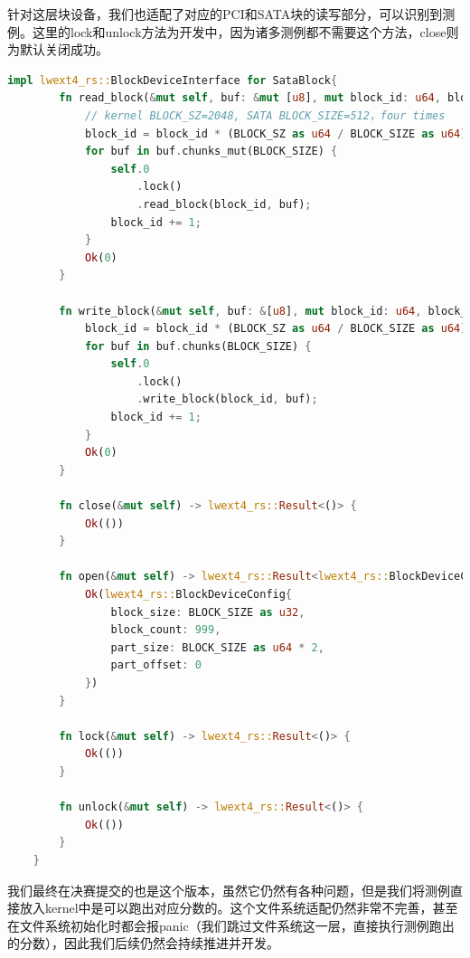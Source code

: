 针对这层块设备，我们也适配了对应的PCI和SATA块的读写部分，可以识别到测例。这里的lock和unlock方法为开发中，因为诸多测例都不需要这个方法，close则为默认关闭成功。
\begin{lstlisting}[language={Rust}, caption={ROOT修改}]
    impl lwext4_rs::BlockDeviceInterface for SataBlock{
        fn read_block(&mut self, buf: &mut [u8], mut block_id: u64, block_count: u32) -> lwext4_rs::Result<usize> {
            // kernel BLOCK_SZ=2048, SATA BLOCK_SIZE=512，four times
            block_id = block_id * (BLOCK_SZ as u64 / BLOCK_SIZE as u64);
            for buf in buf.chunks_mut(BLOCK_SIZE) {
                self.0
                    .lock()
                    .read_block(block_id, buf);
                block_id += 1;
            }
            Ok(0)
        }
    
        fn write_block(&mut self, buf: &[u8], mut block_id: u64, block_count: u32) -> lwext4_rs::Result<usize> {
            block_id = block_id * (BLOCK_SZ as u64 / BLOCK_SIZE as u64);
            for buf in buf.chunks(BLOCK_SIZE) {
                self.0
                    .lock()
                    .write_block(block_id, buf);
                block_id += 1;
            }
            Ok(0)
        }
        
        fn close(&mut self) -> lwext4_rs::Result<()> {
            Ok(())
        }
    
        fn open(&mut self) -> lwext4_rs::Result<lwext4_rs::BlockDeviceConfig> {
            Ok(lwext4_rs::BlockDeviceConfig{
                block_size: BLOCK_SIZE as u32,
                block_count: 999,
                part_size: BLOCK_SIZE as u64 * 2,
                part_offset: 0
            })
        }
    
        fn lock(&mut self) -> lwext4_rs::Result<()> {
            Ok(())
        }
    
        fn unlock(&mut self) -> lwext4_rs::Result<()> {
            Ok(())
        }
    }
    \end{lstlisting}
    
我们最终在决赛提交的也是这个版本，虽然它仍然有各种问题，但是我们将测例直接放入kernel中是可以跑出对应分数的。这个文件系统适配仍然非常不完善，甚至在文件系统初始化时都会报panic（我们跳过文件系统这一层，直接执行测例跑出的分数），因此我们后续仍然会持续推进并开发。